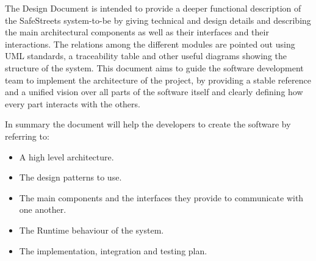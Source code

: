 The Design Document is intended to provide a deeper functional description of the SafeStreets system-to-be by giving technical and design details and describing the main architectural components as well as their interfaces and their interactions. 
The relations among the different modules are pointed out using UML standards, a traceability table and other useful diagrams showing the structure of the system. 
This document aims to guide the software development team to implement the architecture of the project, by providing a stable reference and a unified vision over all parts of the software itself and clearly defining how every part interacts with the others.

In summary the document will help the developers to create the software by referring to:

\begin{itemize}
\item A high level architecture. 
\item The design patterns to use.
\item The main components and the interfaces they provide to communicate with one another.
\item The Runtime behaviour of the system.
\item The implementation, integration and testing plan.
\end{itemize}